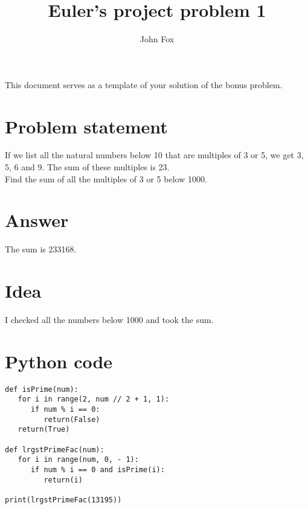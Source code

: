 \documentclass{article}
\title{Euler's project problem 1}
\author{John Fox}
\begin{document}
\maketitle
\large
This document serves as a template of your solution of the bonus problem.\\

\section*{Problem statement} 
If we list all the natural numbers below 10 that are multiples of 3 or 5, we get 3, 5, 6 and 9. The sum of these multiples is 23.\\

Find the sum of all the multiples of 3 or 5 below 1000.

\section*{Answer}
The sum is 233168.
\section*{Idea} I checked all the numbers below 1000 and took the sum.

\section*{Python code}
\begin{verbatim}
def isPrime(num):
   for i in range(2, num // 2 + 1, 1):
      if num % i == 0:
         return(False)
   return(True)

def lrgstPrimeFac(num):
   for i in range(num, 0, - 1):
      if num % i == 0 and isPrime(i):
         return(i)

print(lrgstPrimeFac(13195))
     
\end{verbatim}
\end{document}
